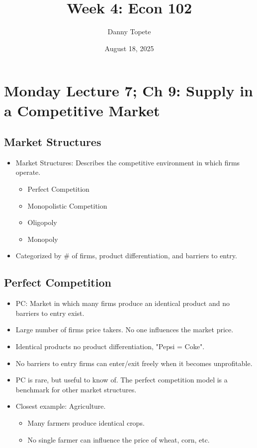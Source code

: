 \documentclass{article}
\title{Week 4: Econ 102}
\author{Danny Topete}
\date{August 18, 2025}
\begin{document}
\maketitle
\section{Monday Lecture 7; Ch 9: Supply in a Competitive Market}

\subsection{Market Structures}
\begin{itemize}
  \item Market Structures:
    Describes the competitive environment in which firms operate.
    \begin{itemize}
        \item Perfect Competition
        \item Monopolistic Competition
        \item Oligopoly
        \item Monopoly
    \end{itemize}
  \item Categorized by \# of firms, product differentiation, and barriers to entry.
\end{itemize}

\subsection{Perfect Competition}
\begin{itemize}
  \item PC: Market in which many firms produce an identical product and no barriers to entry exist.
  \item Large number of firms \Rightarrow{} price takers. No one influences the market price.
  \item Identical products \Rightarrow{} no product differentiation, "Pepsi = Coke".
  \item No barriers to entry \Rightarrow{} firms can enter/exit freely when it becomes unprofitable.
  \item PC is rare, but useful to know of.
    The perfect competition model is a benchmark for other market structures.
  \item Closest example: Agriculture.
    \begin{itemize}
        \item Many farmers produce identical crops.
        \item No single farmer can influence the price of wheat, corn, etc.
    \end{itemize}
\end{itemize}
\end{document}
